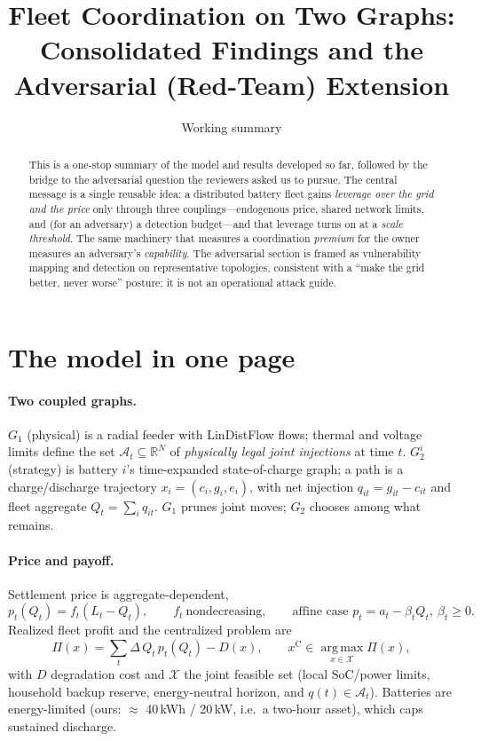 \documentclass[11pt]{article}
\title{Fleet Coordination on Two Graphs:\\
\large Consolidated Findings and the Adversarial (Red-Team) Extension}
\author{}
\date{Working summary}
\newcommand{\R}{\mathbb R}
\newcommand{\X}{\mathcal X}
\newcommand{\cen}{\mathrm C}
\newcommand{\argmax}{\operatorname*{arg\,max}}
\begin{document}
\maketitle

\begin{abstract}
\noindent This is a one-stop summary of the model and results developed so far,
followed by the bridge to the adversarial question the reviewers asked us to
pursue. The central message is a single reusable idea: a distributed battery
fleet gains \emph{leverage over the grid and the price} only through three
couplings---endogenous price, shared network limits, and (for an adversary) a
detection budget---and that leverage turns on at a \emph{scale threshold}. The
same machinery that measures a coordination \emph{premium} for the owner
measures an adversary's \emph{capability}. The adversarial section is framed as
vulnerability mapping and detection on representative topologies, consistent
with a ``make the grid better, never worse'' posture; it is not an operational
attack guide.
\end{abstract}

\section{The model in one page}

\paragraph{Two coupled graphs.}
$G_1$ (physical) is a radial feeder with LinDistFlow flows; thermal and voltage
limits define the set $\mathcal A_t\subseteq\R^N$ of \emph{physically legal
joint injections} at time $t$. $G_2^i$ (strategy) is battery $i$'s
time-expanded state-of-charge graph; a path is a charge/discharge trajectory
$x_i=(c_i,g_i,e_i)$, with net injection $q_{it}=g_{it}-c_{it}$ and fleet
aggregate $Q_t=\sum_i q_{it}$. $G_1$ prunes joint moves; $G_2$ chooses among
what remains.

\paragraph{Price and payoff.}
Settlement price is aggregate-dependent,
\begin{equation}
p_t(Q_t)=f_t(L_t-Q_t),\qquad f_t\ \text{nondecreasing},\qquad
\text{affine case } p_t=a_t-\beta_t Q_t,\ \beta_t\ge 0 .
\label{eq:price}
\end{equation}
Realized fleet profit and the centralized problem are
\begin{equation}
\Pi(x)=\sum_t \Delta\,Q_t\,p_t(Q_t)-D(x),\qquad
x^{\cen}\in\argmax_{x\in\X}\Pi(x),
\label{eq:profit}
\end{equation}
with $D$ degradation cost and $\X$ the joint feasible set (local SoC/power
limits, household backup reserve, energy-neutral horizon, and
$q(t)\in\mathcal A_t$). Batteries are energy-limited (ours: $\approx$ 40\,kWh /
20\,kW, i.e.\ a two-hour asset), which caps sustained discharge.
\end{document}
